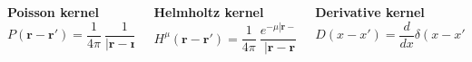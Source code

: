 \documentclass[mathserif, 8pt]{beamer}
\begin{document}
\begin{frame}
\begin{columns}
    \begin{column}{.30\textwidth}
    \centering
    \textbf{Poisson kernel}
    \begin{equation}
	\nonumber
	P(\boldsymbol{r}-\boldsymbol{r}') = 
	    \frac{1}{4\pi}\ \frac{1}{|\boldsymbol{r}-\boldsymbol{r}'|}
    \end{equation}
    \end{column}
    \begin{column}{.30\textwidth}
    \centering
    \textbf{Helmholtz kernel}
    \begin{equation}
	\nonumber
	H^{\mu}(\boldsymbol{r}-\boldsymbol{r}') = \frac{1}{4\pi}\ 
	    \frac{e^{-\mu |\boldsymbol{r}-\boldsymbol{r}'|}}{|\boldsymbol{r}-\boldsymbol{r}'|}
    \end{equation}
    \end{column}
    \begin{column}{.30\textwidth}
    \centering
    \textbf{Derivative kernel}
    \begin{equation}
	\nonumber
	D(x-x') = \frac{d}{dx}\delta(x-x')
    \end{equation}
    \end{column}
    \end{columns}    
\end{frame}
\end{document}
